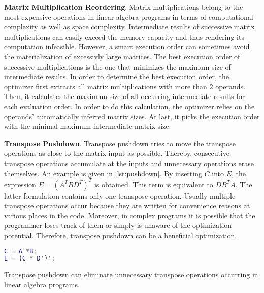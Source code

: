 \textbf{Matrix Multiplication Reordering}. Matrix multiplications belong to the most expensive operations in linear algebra programs in terms of computational complexity as well as space complexity. Intermediate results of successive matrix multiplications can easily exceed the memory capacity and thus rendering its computation infeasible. However, a smart execution order can sometimes avoid the materialization of excessivly large matrices. The best execution order of successive multiplications is the one that minimizes the maximum size of intermediate results.
In order to determine the best execution order, the optimizer first extracts all matrix multiplications with more than $2$ operands.
Then, it calculates the maximum size of all occurring intermediate results for each evaluation order.
In order to do this calculation, the optimizer relies on the operands' automatically inferred matrix sizes.%
At last, it picks the execution order with the minimal maximum intermediate matrix size.


\textbf{Transpose Pushdown}. Transpose pushdown tries to move the transpose operations as close to the matrix input as possible.
Thereby, consecutive transpose operations accumulate at the inputs and unnecessary operations erase themselves.
An example is given in \cref{lst:pushdown}. By inserting $C$ into $E$, the expression $E=(A^T BD^T)^T$ is obtained. This term is equivalent to $DB^T A$. The latter formulation contains only one transpose operation. Usually multiple transpose operations occur because they are written for convenience reasons at various places in the code. Moreover, in complex programs it is possible that the programmer loses track of them or simply is unaware of the optimization potential. Therefore, transpose pushdown can be a beneficial optimization.

\begin{listing}[!h]
    \begin{lstlisting}[language=Matlab, xleftmargin=.4\textwidth]
C = A'*B;
E = (C * D')';
    \end{lstlisting}
  \caption{Transpose pushdown can eliminate unnecessary transpose operations occurring in linear algebra programs.}
  \label{lst:pushdown}
\end{listing}

